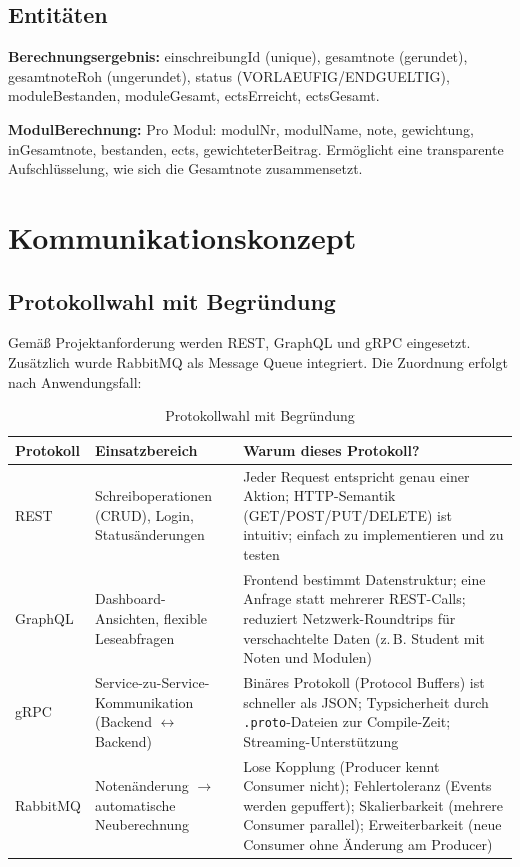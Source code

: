 \documentclass[12pt,a4paper,ngerman]{article}
\begin{document}
\subsection{Entitäten}

\textbf{Berechnungsergebnis:} einschreibungId (unique), gesamtnote (gerundet), gesamtnoteRoh (ungerundet), status (VORLAEUFIG/ENDGUELTIG), moduleBestanden, moduleGesamt, ectsErreicht, ectsGesamt.

\textbf{ModulBerechnung:} Pro Modul: modulNr, modulName, note, gewichtung, inGesamtnote, bestanden, ects, gewichteterBeitrag. Ermöglicht eine transparente Aufschlüsselung, wie sich die Gesamtnote zusammensetzt.

\section{Kommunikationskonzept}

\subsection{Protokollwahl mit Begründung}

Gemäß Projektanforderung werden REST, GraphQL und gRPC eingesetzt. Zusätzlich wurde RabbitMQ als Message Queue integriert. Die Zuordnung erfolgt nach Anwendungsfall:

\begin{table}[H]
\centering
\caption{Protokollwahl mit Begründung}
\begin{tabular}{lL{4cm}L{6cm}}
\toprule
\textbf{Protokoll} & \textbf{Einsatzbereich} & \textbf{Warum dieses Protokoll?} \\
\midrule
REST     & Schreiboperationen (CRUD), Login, Statusänderungen & Jeder Request entspricht genau einer Aktion; HTTP-Semantik (GET/POST/PUT/DELETE) ist intuitiv; einfach zu implementieren und zu testen \\
GraphQL  & Dashboard-Ansichten, flexible Leseabfragen & Frontend bestimmt Datenstruktur; eine Anfrage statt mehrerer REST-Calls; reduziert Netzwerk-Roundtrips für verschachtelte Daten (z.\,B. Student mit Noten und Modulen) \\
gRPC     & Service-zu-Service-Kommunikation (Backend $\leftrightarrow$ Backend) & Binäres Protokoll (Protocol Buffers) ist schneller als JSON; Typsicherheit durch \texttt{.proto}-Dateien zur Compile-Zeit; Streaming-Unterstützung \\
RabbitMQ & Notenänderung $\rightarrow$ automatische Neuberechnung & Lose Kopplung (Producer kennt Consumer nicht); Fehlertoleranz (Events werden gepuffert); Skalierbarkeit (mehrere Consumer parallel); Erweiterbarkeit (neue Consumer ohne Änderung am Producer) \\
\bottomrule
\end{tabular}
\end{table}
\end{document}
